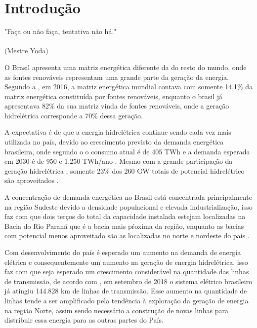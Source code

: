 \chapter{Introdução}
\label{chap:intro}
\begin{flushright}
	"Faça ou não faça, tentativa não há." \\
	\ \\
	(Mestre Yoda)
\end{flushright}

O Brasil apresenta uma matriz energética diferente da do resto do mundo, onde as fontes renováveis representam uma grande parte da geração da energia. Segundo a \cite{epe_site}, em 2016, a matriz energética mundial contava com somente 14,1\% da matriz energética constituída por fontes renováveis, enquanto o brasil já apresentava 82\% da sua matriz vinda de fontes renováveis, onde a geração hidrelétrica corresponde a 70\% dessa geração.

A expectativa é de que a energia hidrelétrica continue sendo cada vez mais utilizada no país, devido ao crescimento previsto da demanda energética brasileira, onde segundo o \cite{atlas_aneel} o consumo atual é de 405 TWh e a demanda esperada em 2030 é de 950 e 1.250 TWh/ano \cite{bronzatti_matrizes}. Mesmo com a grande participação da geração hidrelétrica , somente 23\% dos 260 GW totais de potencial hidrelétrico são aproveitados \cite{atlas_aneel}.

A concentração de demanda energética no Brasil está concentrada principalmente na região Sudeste devido a densidade populacional e elevada industrialização, isso faz com que dois terços do total da  capacidade instalada estejam localizadas na Bacia do Rio Paraná  que é a bacia mais pŕoxima da região, enquanto as bacias com potencial menos aproveitado são as localizadas no norte e nordeste do país \cite{atlas_aneel}.

Com desenvolvimento do país é esperado um aumento na demanda de energia elétrica e consequentemente um aumento na geração de energia hidrelétrica, isso faz com que seja esperado um crescimento considerável na quantidade das linhas de transmissão, de acordo com \cite{MME}, em setembro de 2018 o sistema elétrico brasileiro já atingiu 144.828 km de linhas de transmissão.  Esse aumento na quantidade de linhas tende a ser amplificado pela tendência à exploração da geração de energia na região Norte, assim sendo necessário a construção de novas linhas para distribuir essa energia para as outras partes do País.

